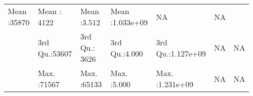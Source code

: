 \documentclass[
]{article}
\begin{document}
\begin{longtable}[]{@{}lllllll@{}}
\begin{minipage}[t]{0.12\columnwidth}
Mean :35870\strut
\end{minipage} & \begin{minipage}[t]{0.12\columnwidth}\raggedright
Mean : 4122\strut
\end{minipage} & \begin{minipage}[t]{0.12\columnwidth}\raggedright
Mean :3.512\strut
\end{minipage} & \begin{minipage}[t]{0.15\columnwidth}\raggedright
Mean :1.033e+09\strut
\end{minipage} & \begin{minipage}[t]{0.14\columnwidth}\raggedright
NA\strut
\end{minipage} & \begin{minipage}[t]{0.14\columnwidth}\raggedright
NA\strut
\end{minipage}\tabularnewline
\begin{minipage}[t]{0.02\columnwidth}\raggedright
\strut
\end{minipage} & \begin{minipage}[t]{0.12\columnwidth}\raggedright
3rd Qu.:53607\strut
\end{minipage} & \begin{minipage}[t]{0.12\columnwidth}\raggedright
3rd Qu.: 3626\strut
\end{minipage} & \begin{minipage}[t]{0.12\columnwidth}\raggedright
3rd Qu.:4.000\strut
\end{minipage} & \begin{minipage}[t]{0.15\columnwidth}\raggedright
3rd Qu.:1.127e+09\strut
\end{minipage} & \begin{minipage}[t]{0.14\columnwidth}\raggedright
NA\strut
\end{minipage} & \begin{minipage}[t]{0.14\columnwidth}\raggedright
NA\strut
\end{minipage}\tabularnewline
\begin{minipage}[t]{0.02\columnwidth}\raggedright
\strut
\end{minipage} & \begin{minipage}[t]{0.12\columnwidth}\raggedright
Max. :71567\strut
\end{minipage} & \begin{minipage}[t]{0.12\columnwidth}\raggedright
Max. :65133\strut
\end{minipage} & \begin{minipage}[t]{0.12\columnwidth}\raggedright
Max. :5.000\strut
\end{minipage} & \begin{minipage}[t]{0.15\columnwidth}\raggedright
Max. :1.231e+09\strut
\end{minipage} & \begin{minipage}[t]{0.14\columnwidth}\raggedright
NA\strut
\end{minipage} & \begin{minipage}[t]{0.14\columnwidth}\raggedright
NA\strut
\end{minipage}\tabularnewline
\bottomrule
\end{longtable}
\end{document}
